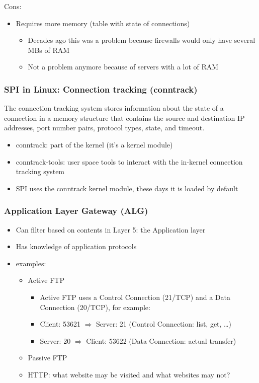 \documentclass{article}
\begin{document}
Cons:

\begin{itemize}
    \item Requires more memory (table with state of connections)
    \begin{itemize}
        \item Decades ago this was a problem because firewalls would only have several MBs of RAM
        \item Not a problem anymore because of servers with a lot of RAM
    \end{itemize}
\end{itemize}

\subsubsection{SPI in Linux: Connection tracking (conntrack)}

The connection tracking system stores information 
about the state of a connection in a memory structure that 
contains the source and destination IP addresses, port number pairs, 
protocol types, state, and timeout.

\begin{itemize}
    \item conntrack: part of the kernel (it's a kernel module)
    \item conntrack-tools: user space tools to interact with the in-kernel connection tracking system
    \item SPI uses the conntrack kernel module, these days it is loaded by default
\end{itemize}

\subsubsection{Application Layer Gateway (ALG)}

\begin{itemize}
    \item Can filter based on contents in Layer 5: the Application layer
    \item Has knowledge of application protocols
    \item examples:
    \begin{itemize}
        \item Active FTP
        \begin{itemize}
            \item Active FTP uses a Control Connection (21/TCP) and a Data Connection (20/TCP), for example:
            \item Client: 53621 $\Rightarrow$ Server: 21 (Control Connection: list, get, \dots)
            \item Server: 20 $\Rightarrow$ Client: 53622 (Data Connection: actual transfer)
        \end{itemize}
        \item Passive FTP
        \item HTTP: what website may be visited and what websites may not?
    \end{itemize}
\end{itemize}
\end{document}
